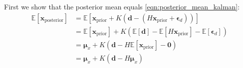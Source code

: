 \documentclass[12pt, a4paper]{article}
\theoremstyle{spaced}
\theoremstyle{spaceddef}
\numberwithin{equation}{section}
\begin{document}
First we show that the posterior mean equals \cref{eqn:posterior_mean_kalman}:
\begin{align*}
    \mathbb{E} \left[ \bm{x}_{\text{posterior}}  \right]
    &= \mathbb{E} \left[ \bm{x}_{\text{prior}} +
    K(\bm{d} - (H \bm{x}_{\text{prior}} + \bm{\epsilon}_d))  \right] \\
    &= \mathbb{E} \left[ \bm{x}_{\text{prior}}  \right]
    +
    K
    \left(
    \mathbb{E} \left[ \bm{d}  \right]
    -
    \mathbb{E} \left[  H \bm{x}_{\text{prior}} \right]
    -
    \mathbb{E} \left[  \bm{\epsilon}_d  \right]
    \right) \\
    &=
    \bm{\mu}_x + K \left(
     \bm{d}
    -
    H \mathbb{E} \left[  \bm{x}_{\text{prior}}  \right]
    -
    \bm{0}
    \right) \\
    &=
    \bm{\mu}_x + K(\bm{d}  - H \bm{\mu}_x )
\end{align*}
\end{document}
